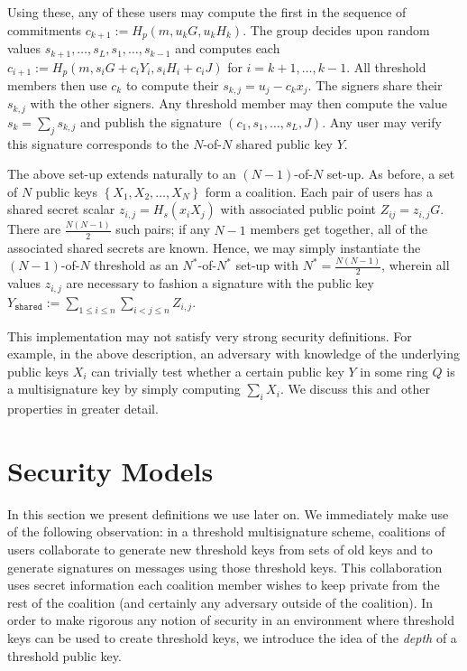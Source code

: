 \documentclass[12pt,english,oneside]{mrl}
\theoremstyle{definition}
\numberwithin{equation}{section}
\numberwithin{figure}{section}
\numberwithin{equation}{section}
\numberwithin{equation}{section}
\numberwithin{figure}{section}
\begin{document}
Using these, any of these users may compute the first in the sequence of commitments $c_{k+1} := H_{p}(m,  u_k G, u_k H_k)$. The group decides upon random values $s_{k+1}, \ldots, s_{L}, s_1, \ldots, s_{k-1}$ and computes each $c_{i+1} := H_{p}(m,  s_{i} G + c_i Y_i, s_{i} H_i + c_i J)$ for $i=k+1, \ldots, k-1$. All threshold members then use $c_k$ to compute their $s_{k,j} = u_j - c_{k} x_j$. The signers share their $s_{k,j}$ with the other signers. Any threshold member may then compute the value $s_{k} = \sum_j s_{k,j}$ and publish the signature $(c_1, s_1, \ldots, s_L, J)$. Any user may verify this signature corresponds to the $N$-of-$N$ shared public key $Y$.

The above set-up extends naturally to an $(N-1)$-of-$N$ set-up. As before, a set of $N$ public keys $\left\{X_{1}, X_{2}, \ldots, X_{N}\right\}$ form a coalition. Each pair of users has a shared secret scalar $z_{i,j} = H_{s}(x_i X_j)$ with associated public point $Z_{ij} = z_{i,j}G$. There are $\frac{N(N-1)}{2}$ such pairs; if any $N-1$ members get together, all of the associated shared secrets are known. Hence, we may simply instantiate the $(N-1)$-of-$N$ threshold as an $N^*$-of-$N^*$ set-up with $N^* = \frac{N(N-1)}{2}$, wherein all values $z_{i,j}$ are necessary to fashion a signature with the public key $Y_{\texttt{shared}}:=\sum_{1 \leq i \leq n} \sum_{i < j \leq n} Z_{i,j}$.

This implementation may not satisfy very strong security definitions. For example, in the above description, an adversary with knowledge of the underlying public keys $X_i$ can trivially test whether a certain public key $Y$ in some ring $Q$ is a multisignature key by simply computing $\sum_i X_i$. We discuss this and other properties in greater detail.




\section{Security Models}

In this section we present definitions we use later on. We immediately make use of the following observation: in a threshold multisignature scheme, coalitions of users collaborate to generate new threshold keys from sets of old keys and to generate signatures on messages using those threshold keys. This collaboration uses secret information each coalition member wishes to keep private from the rest of the coalition (and certainly any adversary outside of the coalition). In order to make rigorous any notion of security in an environment where threshold keys can be used to create threshold keys, we introduce the idea of the \textit{depth} of a threshold public key.
\end{document}
